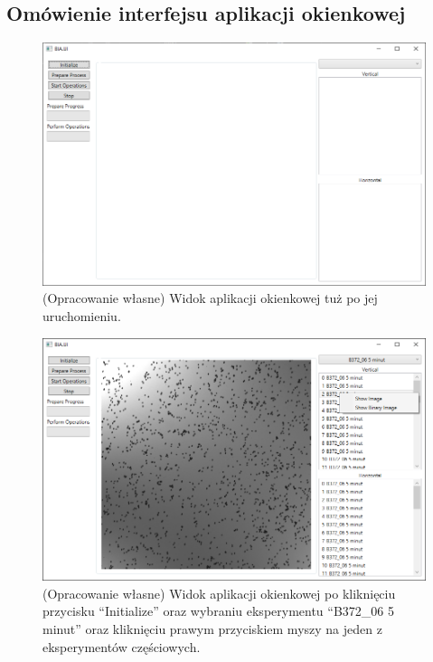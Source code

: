 \documentclass{article}
\begin{document}
        \subsection{Omówienie interfejsu aplikacji okienkowej}
        {
            \label{iexperimentmanager}
            \Large
            \justifying
            \begin{figure}[H]
                \includegraphics[width=\textwidth]{okienkowa-start.png}
                \caption{(Opracowanie własne) Widok aplikacji okienkowej tuż po jej uruchomieniu.}
                \label{okienkowaapkastart}
            \end{figure}
            \begin{figure}[H]
                \includegraphics[width=\textwidth]{context-menu.png}
                \caption{(Opracowanie własne) Widok aplikacji okienkowej po kliknięciu przycisku ``Initialize'' oraz wybraniu eksperymentu ``B372\_06 5 minut'' oraz kliknięciu prawym przyciskiem myszy na jeden z eksperymentów częściowych.}

\end{figure}}
\end{document}
